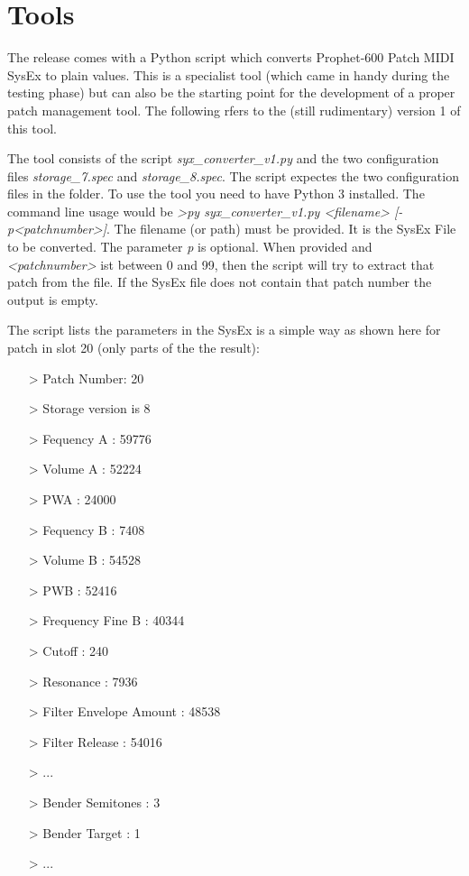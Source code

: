 \documentclass[landscape, 11pt, oneside]{report}
\begin{document}


\section{Tools}

The release comes with a Python script which converts Prophet-600 Patch MIDI SysEx to plain values. This is a specialist tool (which came in handy during the testing phase) but can also be the starting point for the development of a proper patch management tool. The following rfers to the (still rudimentary) version 1 of this tool.

The tool consists of the script \textit{syx\_converter\_v1.py} and the two configuration files \textit{storage\_7.spec} and \textit{storage\_8.spec}. The script expectes the two configuration files in the folder. To use the tool you need to have Python 3 installed. The command line usage would be \textit{>py syx\_converter\_v1.py <filename> [-p<patchnumber>]}. The filename (or path) must be provided. It is the SysEx File to be converted. The parameter \textit{p} is optional. When provided and \textit{<patchnumber>} ist between 0 and 99, then the script will try to extract that patch from the file. If the SysEx file does not contain that patch number the output is empty.

The script lists the parameters in the SysEx is a simple way as shown here for patch in slot 20 (only parts of the the result):

\begin{itemize}
  \item[>] Patch Number:  20 
  \item[>] Storage version is 8
  \item[>] Fequency A :  59776
  \item[>] Volume A :  52224
  \item[>] PWA :  24000 
  \item[>] Fequency B :  7408 
  \item[>] Volume B :  54528
  \item[>] PWB :  52416
  \item[>] Frequency Fine B :  40344
  \item[>] Cutoff :  240
  \item[>] Resonance :  7936
  \item[>] Filter Envelope Amount :  48538
  \item[>] Filter Release :  54016
  \item[>] ...  
  \item[>] Bender Semitones :  3
  \item[>] Bender Target :  1
  \item[>] ...  
\end{itemize}
\end{document}
